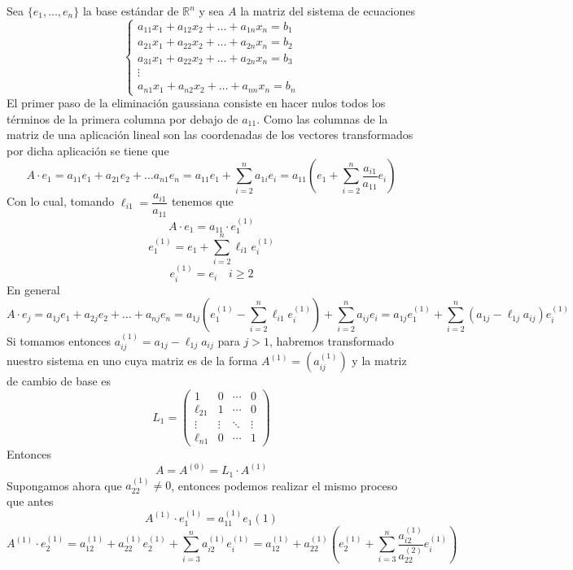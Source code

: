 \begin{met}
Sea $\{e_1,\ldots,e_n\}$ la base estándar de $\mathbb{R}^n$ y sea $A$ la matriz del sistema de ecuaciones   
$$\left\{\begin{array}{l}
                 a_{11}x_1+a_{12}x_2+\ldots+a_{1n}x_n=b_1  \\
                 a_{21}x_1+a_{22}x_2+\ldots+a_{2n}x_n=b_2 \\
                  a_{31}x_1+a_{22}x_2+\ldots+a_{2n}x_n=b_3\\
                 \vdots \\
                 a_{n1}x_1+a_{n2}x_2+\ldots+a_{nn}x_n=b_n
            \end{array}\right.$$
El primer paso de la eliminación gaussiana consiste en hacer nulos todos los términos de la primera columna por debajo de $a_{11}$. Como las columnas de la matriz de una aplicación lineal son las coordenadas de los vectores transformados por dicha aplicación se tiene que
$$A\cdot e_1=a_{11}e_1+a_{21}e_2+\ldots a_{n1}e_n=a_{11}e_1+\sum_{i=2}^na_{1i}e_i=a_{11}\left(e_1+\sum_{i=2}^n\dfrac{a_{i1}}{a_{11}}e_i\right)$$
Con lo cual, tomando $\ell_{i1}=\dfrac{a_{i1}}{a_{11}}$  tenemos que
$$A\cdot e_1=a_{11}\cdot e^{(1)}_{1}$$
$$e_1^{(1)}=e_1+\sum_{i=2}^n\ell_{i1} e_i^{(1)} $$
$$e_i^{(1)}=e_i \quad i \geq 2$$
En general
$$A\cdot e_j=a_{1j}e_1+a_{2j}e_2+\ldots +a_{nj}e_n=a_{1j}\left(e_1^{(1)}-\sum_{i=2}^n\ell_{i1}e_i^{(1)}\right)+\sum_{i=2}^na_{ij}e_i=a_{1j}e_1^{(1)}+\sum_{i=2}^n\left(a_{1j}-\ell_{1j}a_{ij}\right)e_i^{(1)}$$
Si tomamos entonces $a_{ij}^{(1)}=a_{1j}-\ell_{1j}a_{ij}$ para $j>1$, habremos transformado nuestro sistema en uno cuya matriz es de la forma  $A^{(1)}=(a_{ij}^{(1)})$  y la matriz de cambio de base es 
       $$L_1=\begin{pmatrix}
           1 & 0 & \cdots & 0 \\
           \ell_{21} & 1 & \cdots & 0 \\
           \vdots &\vdots &  \ddots & \vdots \\
           \ell_{n1} & 0 & \cdots & 1 
       \end{pmatrix}$$
       Entonces 
       $$A=A^{(0)}=L_1 \cdot A^{(1)}$$
Supongamos ahora que $a_{22}^{(1)} \neq 0$, entonces podemos realizar el mismo proceso que antes
$$A^{(1)}\cdot e^{(1)}_1=a_{11}^{(1)}e_1{(1)}$$
$$A^{(1)}\cdot e_2^{(1)}=a_{12}^{(1)}+a_{22}^{(1)}e_2^{(1)}+\sum_{i=3}^n a_{i2}^{(1)}e_i^{(1)}=a_{12}^{(1)}+a_{22}^{(1)}\left(e_2^{(1)}+\sum_{i=3}^n \dfrac{a_{i2}^{(1)}}{a_{22}^{(2)}}e_i^{(1)}\right)$$

\end{met}
